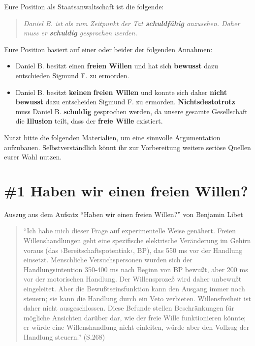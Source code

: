 \documentclass[
  a4paper,
]{report}
\begin{document}
Eure Position als Staatsanwaltschaft ist die folgende:

\begin{quote}
\emph{Daniel B. ist als zum Zeitpunkt der Tat \textbf{schuldfähig} anzusehen. Daher muss er \textbf{schuldig} gesprochen werden.}
\end{quote}

Eure Position basiert auf einer oder beider der folgenden Annahmen:

\begin{itemize}
\item
  Daniel B. besitzt einen \textbf{freien Willen} und hat sich \textbf{bewusst} dazu entschieden Sigmund F. zu ermorden.
\item
  Daniel B. besitzt \textbf{keinen} \textbf{freien Willen} und konnte sich daher \textbf{nicht} \textbf{bewusst} dazu entscheiden Sigmund F. zu ermorden. \textbf{Nichtsdestotrotz} muss Daniel B. \textbf{schuldig} gesprochen werden, da unsere gesamte Gesellschaft die \textbf{Illusion} teilt, dass der \textbf{freie Wille} existiert.
\end{itemize}

Nutzt bitte die folgenden Materialien, um eine sinnvolle Argumentation aufzubauen. Selbstverständlich könnt ihr zur Vorbereitung weitere seriöse Quellen eurer Wahl nutzen.

\hypertarget{pr-ev1}{%
\section{\#1 Haben wir einen freien Willen?}\label{pr-ev1}}

Auszug aus dem Aufsatz ``Haben wir einen freien Willen?'' von Benjamin Libet \citeyearpar{Libet2004}

\begin{quote}
``Ich habe mich dieser Frage auf experimentelle Weise genähert. Freien Willenshandlungen geht eine spezifische elektrische Veränderung im Gehirn voraus (das ›Bereitschaftspotentiak‹, BP), das 550 ms vor der Handlung einsetzt. Menschliche Versuchspersonen wurden sich der Handlungsintention 350-400 ms nach Beginn von BP bewußt, aber 200 ms vor der motorischen Handlung. Der Willensprozeß wird daher unbewußt eingeleitet. Aber die Bewußtseinsfunktion kann den Ausgang immer noch steuern; sie kann die Handlung durch ein Veto verbieten. Willensfreiheit ist daher nicht ausgeschlossen. Diese Befunde stellen Beschränkungen für mögliche Ansichten darüber dar, wie der freie Wille funktionieren könnte; er würde eine Willenshandlung nicht einleiten, würde aber den Vollzug der Handlung steuern.'' (S.268)
\end{quote}
\end{document}
